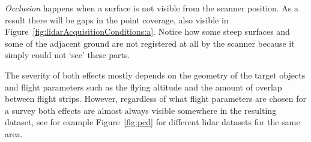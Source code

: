 \emph{Occlusion} happens when a surface is not visible from the scanner position. 
As a result there will be gaps in the point coverage, also visible in Figure~\ref{fig:lidarAcquisitionConditions:a}. 
Notice how some steep surfaces and some of the adjacent ground are not registered at all by the scanner because it simply could not `see' these parts.

The severity of both effects mostly depends on the geometry of the target objects and flight parameters such as the flying altitude and the amount of overlap between flight strips.
However, regardless of what flight parameters are chosen for a survey both effects are almost always visible somewhere in the resulting dataset, see for example Figure~\ref{fig:pcd} for different lidar datasets for the same area.


